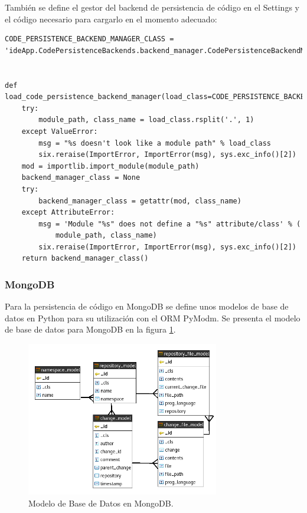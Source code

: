 También se define el gestor del backend de persistencia de código en el Settings y el código necesario para cargarlo en el momento adecuado:
\lstset{language=Python}
\begin{lstlisting}[breaklines]
CODE_PERSISTENCE_BACKEND_MANAGER_CLASS = 'ideApp.CodePersistenceBackends.backend_manager.CodePersistenceBackendManager'


def load_code_persistence_backend_manager(load_class=CODE_PERSISTENCE_BACKEND_MANAGER_CLASS):
    try:
        module_path, class_name = load_class.rsplit('.', 1)
    except ValueError:
        msg = "%s doesn't look like a module path" % load_class
        six.reraise(ImportError, ImportError(msg), sys.exc_info()[2])
    mod = importlib.import_module(module_path)
    backend_manager_class = None
    try:
        backend_manager_class = getattr(mod, class_name)
    except AttributeError:
        msg = 'Module "%s" does not define a "%s" attribute/class' % (
            module_path, class_name)
        six.reraise(ImportError, ImportError(msg), sys.exc_info()[2])
    return backend_manager_class()

\end{lstlisting}
\lstset{language=Bash}

\subsubsection{MongoDB}
Para la persistencia de código en MongoDB se define unos modelos de base de datos en Python para su utilización con el ORM PyModm. Se presenta el modelo de base de datos para MongoDB en la figura \ref{nosql-db}.

\begin{figure}
	\begin{center}
    	\includegraphics[width=0.75\textwidth]{Figures/nosql-db.png}
    \end{center}
  	\caption{Modelo de Base de Datos en MongoDB.}
    \label{nosql-db}
\end{figure}

